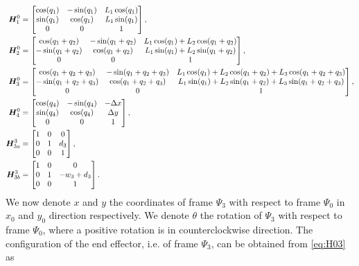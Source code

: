 \documentclass[../DC2019003Bouma.tex]{subfiles}
\begin{document}
\begin{align}
{\boldsymbol{H}}^0_1 &= \begin{bmatrix}
\cos(q_1) & -\sin(q_1) & L_1\cos(q_1) \\
\sin(q_1) & \cos(q_1) & L_1\sin(q_1)\\
0 & 0 & 1
\end{bmatrix},\label{eq:H01}\\
{\boldsymbol{H}}^0_2 &= \begin{bmatrix}
\cos(q_1+q_2) & -\sin(q_1+q_2) & L_1\cos(q_1) + L_2\cos(q_1+q_2) \\
-\sin(q_1+q_2) & \cos(q_1+q_2) & L_1\sin(q_1) + L_2\sin(q_1+q_2)\\
0 & 0 & 1 
\end{bmatrix},\label{eq:H02}\\
{\boldsymbol{H}}^0_3 &= \begin{bmatrix}
\cos(q_1+q_2+q_3) & -\sin(q_1+q_2+q_3) & L_1\cos(q_1) + L_2\cos(q_1+q_2) + L_3\cos(q_1+q_2+q_3) \\
-\sin(q_1+q_2+q_3) & \cos(q_1+q_2+q_3) & L_1\sin(q_1) + L_2\sin(q_1+q_2) + L_3\sin(q_1+q_2+q_3)\\
0 & 0 & 1 
\end{bmatrix},\label{eq:H03}\\
{\boldsymbol{H}}^0_4 &= \begin{bmatrix}
\cos(q_4) & -\sin(q_4) & -\Delta x \\
\sin(q_4) & \cos(q_4) & \Delta y\\
0 & 0 & 1
\end{bmatrix},\label{eq:H04}\\
{\boldsymbol{H}}^3_{3a} &= \begin{bmatrix}
1 & 0 & 0 \\
0 & 1 & d_3\\
0 & 0 & 1
\end{bmatrix},\label{eq:H33a}\\
{\boldsymbol{H}}^3_{3b} &= \begin{bmatrix}
1 & 0 & 0 \\
0 & 1 & -w_3 + d_3\\
0 & 0 & 1
\end{bmatrix}.\label{eq:H33b}
\end{align}
We now denote $x$ and $y$ the coordinates of frame $\Psi_3$ with respect to frame $\Psi_0$ in $x_0$ and $y_0$ direction respectively. We denote $\theta$ the rotation of $\Psi_3$ with respect to frame $\Psi_0$, where a positive rotation is in counterclockwise direction. The configuration of the end effector, i.e. of frame $\Psi_3$, can be obtained from \eqref{eq:H03} as
\end{document}
